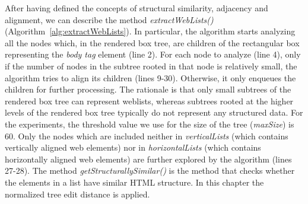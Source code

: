 After having defined the concepts of structural similarity, adjacency and alignment,  we can describe the method \emph{extractWebLists()} (Algorithm~\ref{alg:extractWebLists}). In particular, the algorithm starts analyzing all the nodes which, in the rendered box tree, are children of the rectangular box representing the \emph{body tag} element (line 2). For each node to analyze (line 4), only if the number of nodes in the subtree rooted in that node is relatively small, the algorithm tries to align its children (lines 9-30). Otherwise, it only enqueues the children for further processing. The rationale is that only small subtrees of the rendered box tree can represent weblists, whereas  subtrees rooted at the higher levels of the rendered box tree typically do not represent any structured data. For the experiments, the threshold value we use for the size of the tree (\emph{maxSize}) is 60. 
Only the nodes which are included neither in \emph{verticalLists} (which contains vertically aligned web elements) nor in \emph{horizontalLists} (which contains horizontally aligned web elements) are further explored by the algorithm (lines 27-28). 
The method \textit{getStructurallySimilar()} is the method that checks whether the elements in a list have similar HTML structure. In this chapter the normalized tree edit distance is applied.


